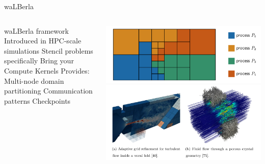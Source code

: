 \placelogofalse
\begin{frame}{waLBerla}
\begin{columns}
\begin{outline}
  \1 waLBerla framework 
  \2 Introduced in \cite{Bauer2021} 
  \2 HPC-scale simulations
  \2 Stencil problems specifically
  \2 Bring your Compute Kernels
  \1 Provides:
  \2 Multi-node domain partitioning
  \2 Communication patterns 
  \2 Checkpoints
\end{outline}
\begin{center}
  \vspace{0.5cm}
  \includegraphics[width=0.8\linewidth]{walberla_partition.png}
  \vspace{0.5cm}
  \includegraphics[width=0.8\linewidth]{walberla_examples.png}
\end{center} 
\end{columns}
\end{frame}
\placelogotrue

